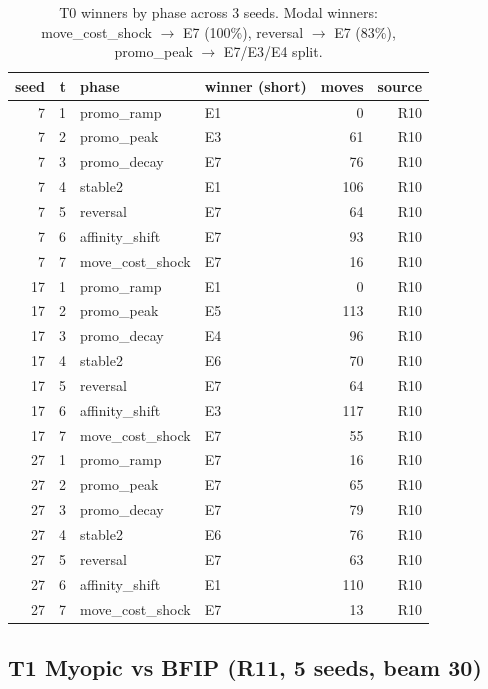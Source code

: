 \documentclass[11pt,a4paper]{article}
\begin{document}
\begin{table}[H]
\centering
\scriptsize
\begin{tabular}{rrl lrr}
\toprule
seed & t & phase & winner (short) & moves & source \\
\midrule
7  & 1 & promo\_ramp     & E1 & 0   & R10 \\
7  & 2 & promo\_peak     & E3 & 61  & R10 \\
7  & 3 & promo\_decay    & E7 & 76  & R10 \\
7  & 4 & stable2         & E1 & 106 & R10 \\
7  & 5 & reversal        & E7 & 64  & R10 \\
7  & 6 & affinity\_shift  & E7 & 93  & R10 \\
7  & 7 & move\_cost\_shock & E7 & 16  & R10 \\
17 & 1 & promo\_ramp     & E1 & 0   & R10 \\
17 & 2 & promo\_peak     & E5 & 113 & R10 \\
17 & 3 & promo\_decay    & E4 & 96  & R10 \\
17 & 4 & stable2         & E6 & 70  & R10 \\
17 & 5 & reversal        & E7 & 64  & R10 \\
17 & 6 & affinity\_shift  & E3 & 117 & R10 \\
17 & 7 & move\_cost\_shock & E7 & 55  & R10 \\
27 & 1 & promo\_ramp     & E7 & 16  & R10 \\
27 & 2 & promo\_peak     & E7 & 65  & R10 \\
27 & 3 & promo\_decay    & E7 & 79  & R10 \\
27 & 4 & stable2         & E6 & 76  & R10 \\
27 & 5 & reversal        & E7 & 63  & R10 \\
27 & 6 & affinity\_shift  & E1 & 110 & R10 \\
27 & 7 & move\_cost\_shock & E7 & 13  & R10 \\
\bottomrule
\end{tabular}
\caption{T0 winners by phase across 3 seeds. Modal winners:
move\_cost\_shock $\to$ E7 (100\%), reversal $\to$ E7 (83\%), promo\_peak
$\to$ E7/E3/E4 split. \label{tab:r10}}
\end{table}

\subsection{T1 Myopic vs BFIP (R11, 5 seeds, beam 30)}
\end{document}
